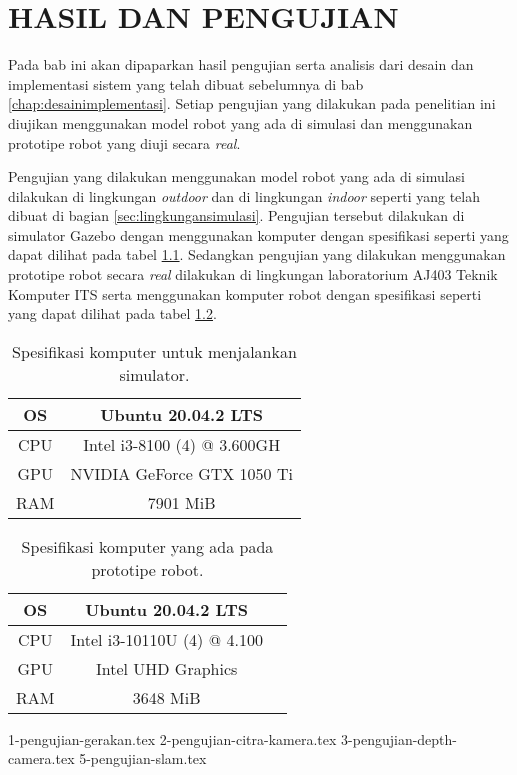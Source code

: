 \chapter{HASIL DAN PENGUJIAN}
\label{chap:hasilpengujian}

Pada bab ini akan dipaparkan hasil pengujian serta analisis dari desain dan implementasi sistem yang telah dibuat sebelumnya di bab \ref{chap:desainimplementasi}.
Setiap pengujian yang dilakukan pada penelitian ini diujikan menggunakan model robot yang ada di simulasi dan menggunakan prototipe robot yang diuji secara \emph{real}.

Pengujian yang dilakukan menggunakan model robot yang ada di simulasi dilakukan di lingkungan \emph{outdoor} dan di lingkungan \emph{indoor} seperti yang telah dibuat di bagian \ref{sec:lingkungansimulasi}.
Pengujian tersebut dilakukan di simulator Gazebo dengan menggunakan komputer dengan spesifikasi seperti yang dapat dilihat pada tabel \ref{tb:spesifikasikomputersimulator}.
Sedangkan pengujian yang dilakukan menggunakan prototipe robot secara \emph{real} dilakukan di lingkungan laboratorium AJ403 Teknik Komputer ITS serta menggunakan komputer robot dengan spesifikasi seperti yang dapat dilihat pada tabel \ref{tb:spesifikasikomputerrobot}.

\begin{longtable}{|c|c|}
  \caption{Spesifikasi komputer untuk menjalankan simulator.}
  \label{tb:spesifikasikomputersimulator}\\
  \hline
  OS  & Ubuntu 20.04.2 LTS \\
  \hline
  CPU & Intel i3-8100 (4) @ 3.600GH \\
  \hline
  GPU & NVIDIA GeForce GTX 1050 Ti \\
  \hline
  RAM & 7901 MiB \\
  \hline
\end{longtable}

\begin{longtable}{|c|c|c|}
  \caption{Spesifikasi komputer yang ada pada prototipe robot.}
  \label{tb:spesifikasikomputerrobot}\\
  \hline
  OS  & Ubuntu 20.04.2 LTS \\
  \hline
  CPU & Intel i3-10110U (4) @ 4.100 \\
  \hline
  GPU & Intel UHD Graphics \\
  \hline
  RAM & 3648 MiB \\
  \hline
\end{longtable}

{1-pengujian-gerakan.tex}
{2-pengujian-citra-kamera.tex}
{3-pengujian-depth-camera.tex}
{5-pengujian-slam.tex}
